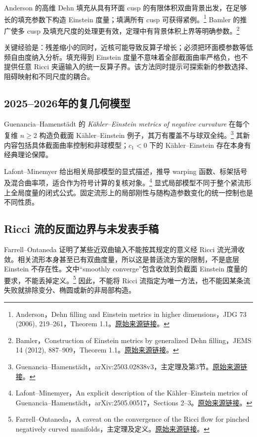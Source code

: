 \documentclass[11pt,a4paper]{article}
\theoremstyle{definition}
\newcommand{\src}[3]{\footnote{\raggedright #1，#2。\href{#3}{原始来源链接}。}}
\begin{document}
Anderson 的高维 Dehn 填充从具有环面 cusp 的有限体积双曲背景出发，在足够长的填充参数下构造 Einstein 度量；填满所有 cusp 可获得紧例。\src{Anderson}{Dehn filling and Einstein metrics in higher dimensions，JDG 73 (2006), 219--261，Theorem 1.1}{https://www.math.stonybrook.edu/~anderson/dehn.pdf}
Bamler 的推广使多 cusp 及填充尺度的处理更有效，定理中有背景体积上界等明确参数。\src{Bamler}{Construction of Einstein metrics by generalized Dehn filling，JEMS 14 (2012), 887--909，Theorem 1.1}{https://arxiv.org/abs/0911.4730v2}

关键经验是：残差缩小的同时，近核可能导致反算子增长；必须把环面模参数等低频自由度纳入分析。填充得到 Einstein 度量不意味着全部截面曲率严格负，也不提供任意 Ricci 夹逼输入的统一反算子界。该方法同时提示可探索新的参数选择、阻碍映射和不同尺度的耦合。

\subsection{2025--2026年的复几何模型}

Guenancia--Hamenstädt 的 \emph{Kähler--Einstein metrics of negative curvature} 在每个复维 $n\ge2$ 构造负截面 Kähler--Einstein 例子，其万有覆盖不与球双全纯。\src{Guenancia--Hamenstädt}{arXiv:2503.02838v3，主定理及第3节}{https://arxiv.org/abs/2503.02838v3}
其新内容包括具体截面曲率控制和非球模型；$c_1<0$ 下的 Kähler--Einstein 存在本身有经典理论保障。

Lafont--Minemyer 给出相关局部模型的显式描述，推导 warping 函数、标架括号及混合曲率项，适合作为符号计算的复核对象。\src{Lafont--Minemyer}{An explicit description of the Kähler--Einstein metrics of Guenancia--Hamenstädt，arXiv:2505.00517，Sections 2--3}{https://arxiv.org/abs/2505.00517}
显式局部模型不同于整个紧流形上全局度量的闭式公式。固定流形上的局部刚性与随构造参数变化的统一控制也是不同性质。

\subsection{Ricci 流的反面边界与未发表手稿}

Farrell--Ontaneda 证明了某些近双曲输入不能按其规定的意义经 Ricci 流光滑收敛。相关流形本身甚至已有双曲度量，所以这是普适流方案的限制，不是底层 Einstein 不存在性。文中“smoothly converge”包含收敛到负截面 Einstein 度量的要求，不能丢掉定义。\src{Farrell--Ontaneda}{A caveat on the convergence of the Ricci flow for pinched negatively curved manifolds，主定理及定义}{https://arxiv.org/abs/math/0311176v2}
因此，不能将 Ricci 流指定为唯一方法，也不能因某条流失败就排除变分、椭圆或新的非局部构造。
\end{document}
